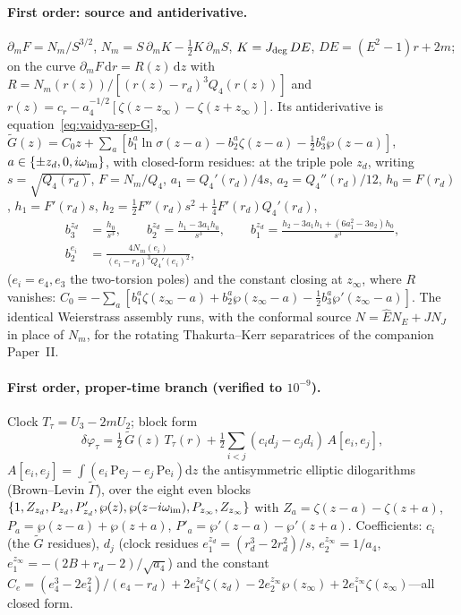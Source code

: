 \documentclass[12pt]{iopart}
\newcommand{\Ehat}{\hat E}
\newcommand{\Jc}{J_{\rm deg}}
\newcommand{\dd}{\mathrm{d}}
\begin{document}
\paragraph{First order: source and antiderivative.}
$\partial_m F=N_m/S^{3/2}$, $N_m=S\,\partial_mK-\tfrac12K\,\partial_mS$, $K=\Jc\,DE$,
$DE=(E^2-1)r+2m$; on the curve $\partial_m F\,\dd r=R(z)\,\dd z$ with
$R=N_m(r(z))/[(r(z)-r_d)^3Q_4(r(z))]$ and $r(z)=c_r-a_4^{-1/2}[\zeta(z-z_\infty)-
\zeta(z+z_\infty)]$. Its antiderivative is equation~\eqref{eq:vaidya-sep-G},
$\tilde G(z)=C_0 z+\sum_{a}[b_1^a\ln\sigma(z-a)-b_2^a\zeta(z-a)-\tfrac12 b_3^a
\wp(z-a)]$, $a\in\{\pm z_d,0,i\omega_{\rm im}\}$, with closed-form residues: at the
triple pole $z_d$, writing $s=\sqrt{Q_4(r_d)}$, $F=N_m/Q_4$, $a_1=Q_4'(r_d)/4s$,
$a_2=Q_4''(r_d)/12$, $h_0=F(r_d)$, $h_1=F'(r_d)s$,
$h_2=\tfrac12F''(r_d)s^2+\tfrac14F'(r_d)Q_4'(r_d)$,
\begin{equation}
\begin{aligned}
b_3^{z_d}&=\frac{h_0}{s^3},\qquad
b_2^{z_d}=\frac{h_1-3a_1h_0}{s^3},\qquad
b_1^{z_d}=\frac{h_2-3a_1h_1+(6a_1^2-3a_2)h_0}{s^3},\\
b_2^{e_i}&=\frac{4N_m(e_i)}{(e_i-r_d)^3Q_4'(e_i)^2},
\end{aligned}
\end{equation}
($e_i=e_4,e_3$ the two-torsion poles) and the constant closing at $z_\infty$, where
$R$ vanishes: $C_0=-\sum_a[b_1^a\zeta(z_\infty-a)+b_2^a\wp(z_\infty-a)-\tfrac12
b_3^a\wp'(z_\infty-a)]$. The identical Weierstrass assembly runs, with the conformal
source $N=\Ehat N_E+J N_J$ in place of $N_m$, for the rotating Thakurta--Kerr
separatrices of the companion Paper~II.

\paragraph{First order, proper-time branch (verified to $10^{-9}$).}
Clock $T_\tau=U_3-2mU_2$; block form
\begin{equation}
\delta\varphi_\tau=\tfrac12\,\tilde G(z)\,T_\tau(r)
+\tfrac12\sum_{i<j}(c_i d_j-c_j d_i)\,A[e_i,e_j],
\end{equation}
$A[e_i,e_j]=\int(e_i\,\mathrm{Pe}_j-e_j\,\mathrm{Pe}_i)\dd z$ the antisymmetric
elliptic dilogarithms (Brown--Levin $\tilde\Gamma$), over the eight even blocks
$\{1,Z_{z_d},P_{z_d},P'_{z_d},\wp(z),\wp(z{-}i\omega_{\rm im}),P_{z_\infty},
Z_{z_\infty}\}$ with $Z_a=\zeta(z{-}a)-\zeta(z{+}a)$,
$P_a=\wp(z{-}a)+\wp(z{+}a)$, $P'_a=\wp'(z{-}a)-\wp'(z{+}a)$. Coefficients: $c_i$ (the
$\tilde G$ residues), $d_j$ (clock residues $e_1^{z_d}=(r_d^3-2r_d^2)/s$,
$e_2^{z_\infty}=1/a_4$, $e_1^{z_\infty}=-(2B+r_d-2)/\sqrt{a_4}$) and the constant
$C_e=(e_4^3-2e_4^2)/(e_4-r_d)+2e_1^{z_d}\zeta(z_d)-2e_2^{z_\infty}\wp(z_\infty)
+2e_1^{z_\infty}\zeta(z_\infty)$---all closed form.
\end{document}
